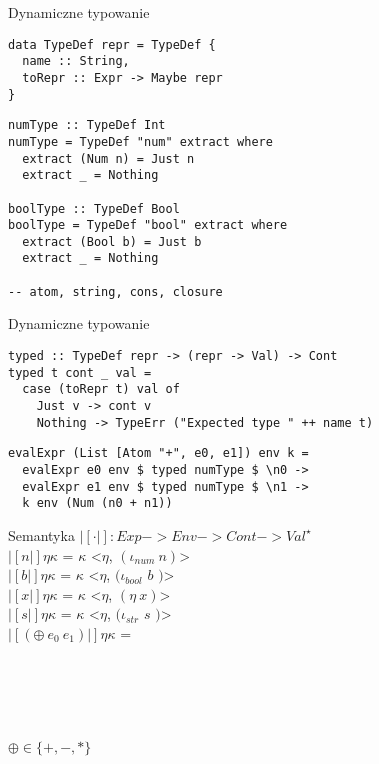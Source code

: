 \documentclass[12pt,serif]{beamer}
\begin{document}
\begin{frame}[fragile]{Dynamiczne typowanie}
\footnotesize \begin{verbatim}
data TypeDef repr = TypeDef {
  name :: String,
  toRepr :: Expr -> Maybe repr
}
\end{verbatim}
\pause
\footnotesize \begin{verbatim}
numType :: TypeDef Int
numType = TypeDef "num" extract where
  extract (Num n) = Just n
  extract _ = Nothing

boolType :: TypeDef Bool
boolType = TypeDef "bool" extract where
  extract (Bool b) = Just b
  extract _ = Nothing
  
-- atom, string, cons, closure
\end{verbatim}
\end{frame}

\begin{frame}[fragile]{Dynamiczne typowanie}
\footnotesize \begin{verbatim}
typed :: TypeDef repr -> (repr -> Val) -> Cont
typed t cont _ val =
  case (toRepr t) val of
    Just v -> cont v
    Nothing -> TypeErr ("Expected type " ++ name t)
\end{verbatim}
\pause
\footnotesize \begin{verbatim}
evalExpr (List [Atom "+", e0, e1]) env k =
  evalExpr e0 env $ typed numType $ \n0 ->
  evalExpr e1 env $ typed numType $ \n1 ->
  k env (Num (n0 + n1))
\end{verbatim}
\end{frame}


\begin{frame}{Semantyka}
$|[ \cdot |]: Exp -> Env -> Cont -> Val^{\star}$ \newline
\\
$|[n|] \eta \kappa$ = $\kappa$ <$\eta$, $(\iota_{num}~n)$> \\
$|[b|] \eta \kappa$ = $\kappa$ <$\eta$, $(\iota_{bool}$ $b$ $)$> \\
$|[x|] \eta \kappa$ = $\kappa$ <$\eta$, $(\eta~x)$> \\
$|[s|] \eta \kappa$ = $\kappa$ <$\eta$, $(\iota_{str}$ $s$ $)$> \newline
\\
$|[(\oplus~e_0~e_1)|] \eta \kappa$ = \\
\hspace{1em}{$|[e_0|]$ $\eta$ ($\lambda$ <$\eta_0, n_0$> .} \\
\hspace{2em}{$|[e_1|]$ $\eta$ ($\lambda$ <$\eta_1, n_1$> .} \\
 \\
 \\
 \newline
\\
$\oplus \in \{+,-,*\}$
\end{frame}
\end{document}
